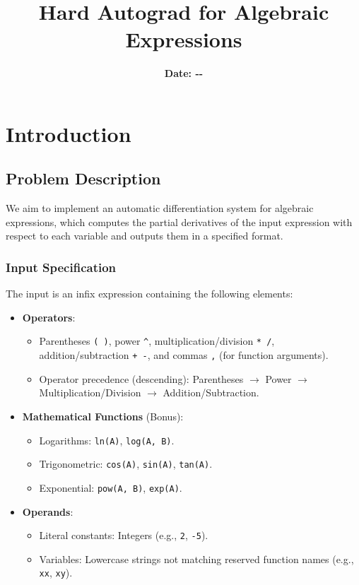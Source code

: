 \documentclass{report}
\title{\Huge\textbf{Hard Autograd for Algebraic Expressions}}
\date{\LARGE\textbf{Date: \the\year-\the\month-\the\day}}
\begin{document}
\maketitle


\chapter{Introduction}
\section*{Problem Description}
We aim to implement an automatic differentiation system for algebraic expressions, which computes the partial derivatives of the input expression with respect to each variable and outputs them in a specified format.

\subsection*{Input Specification}
The input is an infix expression containing the following elements:
\begin{itemize}
    \item \textbf{Operators}: 
    \begin{itemize}
        \item Parentheses \texttt{( )}, power \texttt{\^}, multiplication/division \texttt{* /}, addition/subtraction \texttt{+ -}, and commas \texttt{,} (for function arguments).
        \item Operator precedence (descending): Parentheses $\rightarrow$ Power $\rightarrow$ Multiplication/Division $\rightarrow$ Addition/Subtraction.
    \end{itemize}
    \item \textbf{Mathematical Functions} (Bonus):
    \begin{itemize}
        \item Logarithms: \texttt{ln(A)}, \texttt{log(A, B)}.
        \item Trigonometric: \texttt{cos(A)}, \texttt{sin(A)}, \texttt{tan(A)}.
        \item Exponential: \texttt{pow(A, B)}, \texttt{exp(A)}.
    \end{itemize}
    \item \textbf{Operands}:
    \begin{itemize}
        \item Literal constants: Integers (e.g., \texttt{2}, \texttt{-5}).
        \item Variables: Lowercase strings not matching reserved function names (e.g., \texttt{xx}, \texttt{xy}).
    \end{itemize}
\end{itemize}
\end{document}
